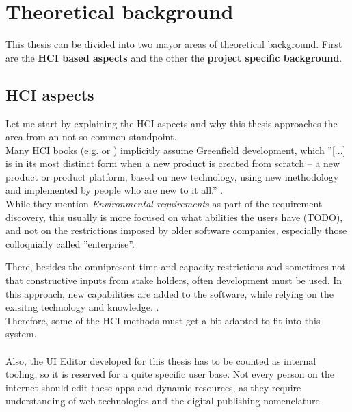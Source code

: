 %
\chapter{Theoretical background}

This thesis can be divided into two mayor areas of theoretical background.
First are the \textbf{HCI based aspects} and the other the \textbf{project specific background}.

\section{HCI aspects}
Let me start by explaining the HCI aspects and why this thesis approaches the area from an not so common standpoint.
\\
Many HCI books (e.g. \cite{Interactiondesign:2019ys} or \cite{LearnHCI:2020ys}) implicitly assume \label{def:Greenfield} Greenfield development,
which ''[...] is in its most distinct form when a new product is created from scratch – a new product or product platform, based on new technology, using new methodology and implemented by people who are new to it all.'' \cite{BrownfieldToGreenfield:2021ys}.
\\
While they mention \textit{Environmental requirements} as part of the requirement discovery, this usually is more focused on what abilities the users have (TODO), and not on the restrictions imposed by older software companies, especially those colloquially called ''enterprise''.

There, besides the omnipresent time and capacity restrictions and sometimes not that constructive inputs from stake holders, often \label{def:Brownfield} development must be used.
In this approach, new capabilities are added to the software, while relying on the exisitng technology and knowledge. \cite{BrownfieldToGreenfield:2021ys}.
\\
Therefore, some of the HCI methods must get a bit adapted to fit into this system.
\\\\
Also, the UI Editor developed for this thesis has to be counted as internal tooling, so it is reserved for a quite specific user base.
Not every person on the internet should edit these apps and dynamic resources, as they require understanding of web technologies and the digital publishing nomenclature.

